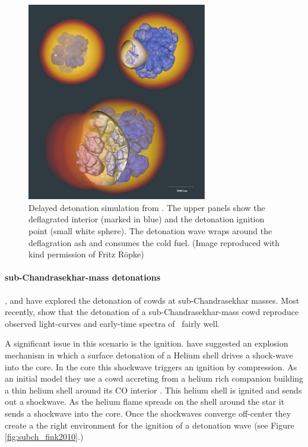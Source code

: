 \begin{figure}[htbp] %
   \centering
   \includegraphics[width=0.7\textwidth]{chapter_intro/plots/ddt_roepke08.pdf}
   \caption{ Delayed detonation simulation from \citet{2008NJPh...10l5009R}. The upper panels show the deflagrated interior (marked in blue) and the detonation ignition point (small white sphere). The detonation wave wraps around the deflagration ash and consumes the cold fuel. (Image reproduced with kind permission of Fritz R\"{o}pke)}
   \label{fig:snia_ddt_roepke2007}
\end{figure}


\paragraph{sub-Chandrasekhar-mass detonations}
\label{sec:subchandra}
\citet{1992ApJ...386L..13S}, \citet{1995ApJ...452...62L} and \citet{2010ApJ...714L..52S} have explored the detonation of \glspl{cowd} at sub-Chandrasekhar masses. Most recently, \citet{2010ApJ...714L..52S} show that the detonation of a sub-Chandrasekhar-mass \gls{cowd} reproduce observed light-curves and early-time spectra of \sneia\ fairly well.

A significant issue in this scenario is the ignition. \cite{2010A&A...514A..53F} have suggested an explosion mechanism in which a surface detonation of a Helium shell drives a shock-wave into the core. In the core this shockwave triggers an ignition by compression.  As an initial model they use a \gls{cowd} accreting from a helium rich companion building a thin helium shell around its CO interior \citep[described in][]{2007ApJ...662L..95B}. This helium shell is ignited and sends out a shockwave. As the helium flame spreads on the shell around the star it sends a shockwave into the core. Once the shockwaves converge off-center they create a the right environment for the ignition of a detonation wave (see Figure \ref{fig:subch_fink2010}.) 

